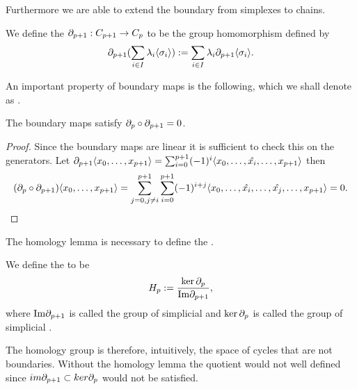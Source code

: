 \documentclass[../1.tex]{subfiles}
\begin{document}
    Furthermore we are able to extend the boundary from simplexes to chains.
    
    \begin{defn}
        We define the  $\partial_{p+1} : C_{p+1} \to C_p$ to be the group homomorphism defined by
        \[ \partial_{p+1}(\sum_{i \in I}\lambda_i\langle \sigma_i \rangle) := \sum_{i \in I}\lambda_i\partial_{p+1}\langle \sigma_i \rangle .\]
    \end{defn}

    An important property of boundary maps is the following, which we shall denote as .

    \begin{lem}
        The boundary maps satisfy $\partial_p \circ \partial_{p+1} = 0$.
    \end{lem}
    \begin{proof}
        Since the boundary maps are linear it is sufficient to check this on the generators.
        Let $\partial_{p+1}\langle x_0,\dots,x_{p+1} \rangle = \sum_{i=0}^{p+1} (-1)^i\langle x_0,\dots,\hat{x_i},\dots,x_{p+1} \rangle$ then 
        \[(\partial_p \circ \partial_{p+1})\langle x_0,\dots,x_{p+1} \rangle = \sum_{j=0, j \neq i}^{p+1} \sum_{i=0}^{p+1} (-1)^{i+j}\langle x_0,\dots,\hat{x_i},\dots,\hat{x_j},\dots,x_{p+1} \rangle = 0. \qedhere \]     
    \end{proof}

    The homology lemma is necessary to define the .

    \begin{defn}
        We define the  to be 
        \[H_p := \frac{\ker\partial_p}{\mathrm{Im}\partial_{p+1}},\] 
        where $\mathrm{Im}\partial_{p+1}$ is called the group of simplicial  and
        $\ker\partial_p$ is called the group of simplicial .
    \end{defn}

    The homology group is therefore, intuitively,  the space of cycles that are not boundaries. Without the
    homology lemma the quotient would not well defined since $im\partial_{p+1} \subset ker\partial_p$ would not be satisfied.
\end{document}
